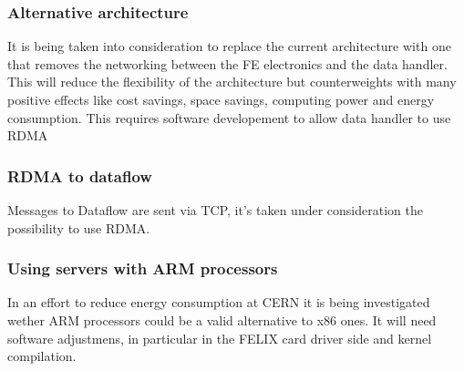 \subsubsection{Alternative architecture}

It is being taken into consideration to replace the current architecture with one that removes the networking between the FE electronics and the data handler. This will reduce the flexibility of the architecture but counterweights with many positive effects like cost savings, space savings, computing power and energy consumption. This requires software developement to allow data handler to use \acs{RDMA}

\subsubsection{\acs{RDMA} to dataflow}

Messages to Dataflow are sent via TCP, it's taken under consideration the possibility to use \acs{RDMA}.

\subsubsection{Using servers with ARM processors}

In an effort to reduce energy consumption at \acs{CERN} it is being investigated wether ARM processors could be a valid alternative to x86 ones. It will need software adjustmens, in particular in the \acs{FELIX} card driver side and kernel compilation.